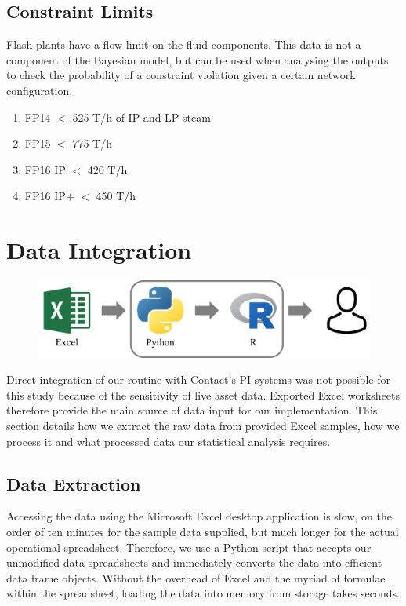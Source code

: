 \documentclass[a4paper, 12pt]{article}
\begin{document}
\subsection{Constraint Limits}
Flash plants have a flow limit on the fluid components. This data is not a component of the Bayesian model, but can be used when analysing the outputs to check the probability of a constraint violation given a certain network configuration.
\begin{enumerate}
\item FP14 $<$ 525 T/h of IP and LP steam
\item FP15 $<$ 775 T/h
\item FP16 IP $<$ 420 T/h
\item FP16 IP+ $<$ 450 T/h
\end{enumerate}


\section{Data Integration}

\begin{figure}
  \centering
  \includegraphics[width=0.5\linewidth]{media/workflow}
  \label{fig:workflow}
\end{figure}

Direct integration of our routine with Contact's PI systems was not possible for this study because of the sensitivity of live asset data. Exported Excel worksheets therefore provide the main source of data input for our implementation. This section details how we extract the raw data from provided Excel samples, how we process it and what processed data our statistical analysis requires.

\subsection{Data Extraction}
Accessing the data using the Microsoft Excel desktop application is slow, on the order of ten minutes for the sample data supplied, but much longer for the actual operational spreadsheet. Therefore, we use a Python script that accepts our unmodified data spreadsheets and immediately converts the data into efficient data frame objects. Without the overhead of Excel and the myriad of formulae within the spreadsheet, loading the data into memory from storage takes seconds.
\end{document}
